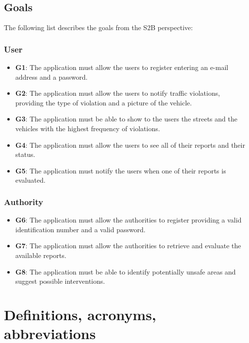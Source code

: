 \documentclass[12pt,a4paper]{report}
\begin{document}
	\subsection{Goals}
	The following list describes the goals from the S2B perspective:
		\subsubsection{User}
	\begin{itemize}
		\item \textbf{G1}: The application must allow the users to register entering an e-mail address and a password.
		\item \textbf{G2}: The application must allow the users to notify traffic violations, providing  the type of violation and a picture of the vehicle.
		\item \textbf{G3}: The application must be able to show to the users the streets and the vehicles with the highest frequency of violations.
		\item \textbf{G4}: The application must allow the users to see all of their reports and their status.
		\item \textbf{G5}: The application must notify the users when one of their reports is evaluated.
	\end{itemize}
		\subsubsection{Authority}
	\begin{itemize}
		\item \textbf{G6}: The application must allow the authorities to register providing a valid identification number and a valid password.
	  	\item \textbf{G7}: The application must allow the authorities to retrieve and evaluate the available reports.
		\item \textbf{G8}: The application must be able to identify potentially unsafe areas and suggest possible interventions.
	\end{itemize}
	

	\section{Definitions, acronyms, abbreviations}
\end{document}
